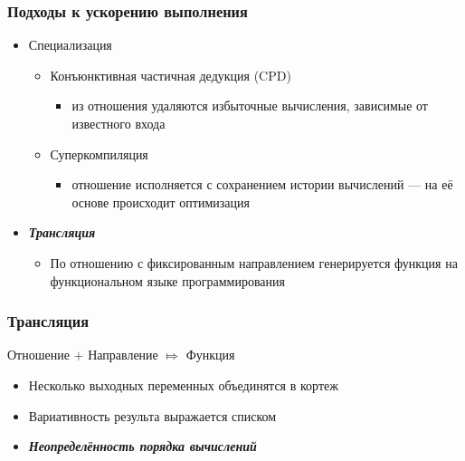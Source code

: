 \documentclass{beamer}
\begin{document}
\begin{frame}\frametitle{Подходы к ускорению выполнения}
\begin{itemize}
    \item Специализация
        \begin{itemize}
            \item Конъюнктивная частичная дедукция (CPD)
                \begin{itemize}
                    \item из отношения удаляются избыточные вычисления, зависимые от известного входа
                \end{itemize}
            \item Суперкомпиляция
                \begin{itemize}
                    \item отношение исполняется с сохранением истории вычислений --- на её основе происходит оптимизация
                \end{itemize}
        \end{itemize}
    \item \textbf{\emph{Трансляция}}
        \begin{itemize}
            \item По отношению с фиксированным направлением генерируется функция на функциональном языке программирования        \end{itemize}
\end{itemize}
\end{frame}

\begin{frame}\frametitle{Трансляция}
Отношение $+$ Направление $\Mapsto$ Функция
\begin{itemize}
    \item Несколько выходных переменных объединятся в кортеж
    \item Вариативность результа выражается списком
    \item \textbf{\emph{Неопределённость порядка вычислений}}
\end{itemize}
\end{frame}
\end{document}
